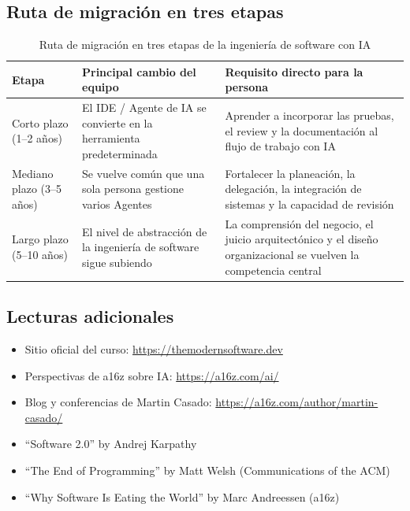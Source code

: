 \subsection{Ruta de migración en tres etapas}

\begin{table}[H]
\centering
\begin{tabular}{p{} p{} p{}}
\toprule
Etapa & Principal cambio del equipo & Requisito directo para la persona \\
\midrule
Corto plazo (1--2 años) & El IDE / Agente de IA se convierte en la herramienta predeterminada & Aprender a incorporar las pruebas, el review y la documentación al flujo de trabajo con IA \\
Mediano plazo (3--5 años) & Se vuelve común que una sola persona gestione varios Agentes & Fortalecer la planeación, la delegación, la integración de sistemas y la capacidad de revisión \\
Largo plazo (5--10 años) & El nivel de abstracción de la ingeniería de software sigue subiendo & La comprensión del negocio, el juicio arquitectónico y el diseño organizacional se vuelven la competencia central \\
\bottomrule
\end{tabular}
\caption{Ruta de migración en tres etapas de la ingeniería de software con IA}
\end{table}

\subsection{Lecturas adicionales}

\begin{itemize}
    \item Sitio oficial del curso: \url{https://themodernsoftware.dev}
    \item Perspectivas de a16z sobre IA: \url{https://a16z.com/ai/}
    \item Blog y conferencias de Martin Casado: \url{https://a16z.com/author/martin-casado/}
    \item ``Software 2.0'' by Andrej Karpathy
    \item ``The End of Programming'' by Matt Welsh (Communications of the ACM)
    \item ``Why Software Is Eating the World'' by Marc Andreessen (a16z)
\end{itemize}



